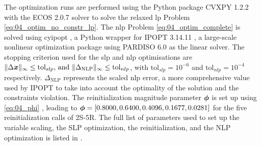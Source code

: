 The optimization runs are performed using the Python package CVXPY 1.2.2  with the ECOS 2.0.7  solver to solve the relaxed \gls{lp} Problem \eqref{eq:04_optim_no_constr_lp}. The \gls{nlp} Problem \eqref{eq:04_optim_complete} is solved using cyipopt , a Python wrapper for IPOPT 3.14.11 , a large-scale nonlinear optimization package using PARDISO 6.0  as the linear solver. The stopping criterion used for the \gls{slp} and \gls{nlp} optimisations are $\lVert\Delta \bm{x}\rVert_\infty \leq \text{tol}_{slp}  \text{, and } \lVert\Delta_{\text{NLP}}\rVert_\infty \leq \text{tol}_{nlp}$, with $\text{tol}_{slp}=10^{-6}$ and $\text{tol}_{nlp}=10^{-4}$ respectively. $\Delta_{\text{NLP}}$ represents the scaled \gls{nlp} error, a more comprehensive value used by IPOPT to take into account the optimality of the solution and the constraints violation. The reinitialization magnitude parameter $\bm{\phi}$ is set up using \eqref{eq:04_phi} , leading to $\bm{\phi} = \left[ 0.8000, 0.6400, 0.4096, 0.1677, 0.0281 \right]$ for the five reinitialization calls of 2S-5R. The full list of parameters used to set up the variable scaling, the SLP optimization, the reinitialization, and the NLP optimization is listed in .

